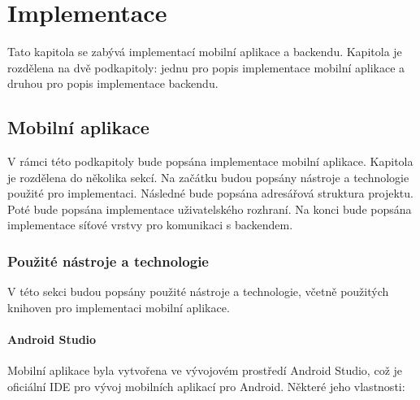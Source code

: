 \chapter{Implementace}
\setcounter{page}{1}

Tato kapitola se zabývá implementací mobilní aplikace a backendu. Kapitola je rozdělena na dvě podkapitoly: jednu pro popis implementace mobilní aplikace a druhou pro popis implementace backendu.

\section{Mobilní aplikace}

V rámci této podkapitoly bude popsána implementace mobilní aplikace. Kapitola je rozdělena do několika sekcí. Na začátku budou popsány nástroje a technologie použité pro implementaci. Následné bude popsána adresářová struktura projektu. Poté bude popsána implementace uživatelského rozhraní. Na konci bude popsána implementace síťové vrstvy pro komunikaci s backendem.

\subsection{Použité nástroje a technologie}
V této sekci budou popsány použité nástroje a technologie, včetně použitých knihoven pro implementaci mobilní aplikace.

\subsubsection *{Android Studio}
Mobilní aplikace byla vytvořena ve vývojovém prostředí Android Studio, což je oficiální IDE pro vývoj mobilních aplikací pro Android. Některé jeho vlastnosti:


